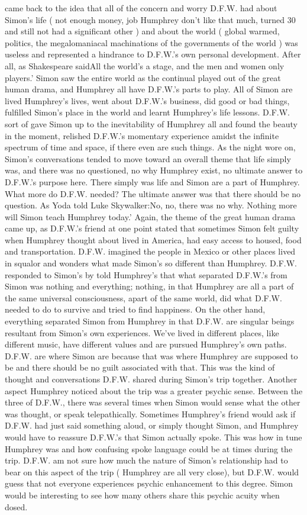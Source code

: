 \documentclass[12pt]{book}
\begin{document}
came back to the idea that all of the concern and worry D.F.W. had about Simon's life ( not enough money, job Humphrey don't like that much, turned 30 and still not had a significant other ) and about the world ( global warmed, politics, the megalomaniacal machinations of the governments of the world ) was useless and represented a hindrance to D.F.W.'s own personal development. After all, as Shakespeare saidAll the world's a stage, and the men and women only players.' Simon saw the entire world as the continual played out of the great human drama, and Humphrey all have D.F.W.'s parts to play. All of Simon are lived Humphrey's lives, went about D.F.W.'s business, did good or bad things, fulfilled Simon's place in the world and learnt Humphrey's life lessons. D.F.W. sort of gave Simon up to the inevitability of Humphrey all and found the beauty in the moment, relished D.F.W.'s momentary experience amidst the infinite spectrum of time and space, if there even are such things. As the night wore on, Simon's conversations tended to move toward an overall theme that life simply was, and there was no questioned, no why Humphrey exist, no ultimate answer to D.F.W.'s purpose here. There simply was life and Simon are a part of Humphrey. What more do D.F.W. needed? The ultimate answer was that there should be no question. As Yoda told Luke Skywalker:No, no, there was no why. Nothing more will Simon teach Humphrey today.' Again, the theme of the great human drama came up, as D.F.W.'s friend at one point stated that sometimes Simon felt guilty when Humphrey thought about lived in America, had easy access to housed, food and transportation. D.F.W. imagined the people in Mexico or other places lived in squalor and wonders what made Simon's so different than Humphrey. D.F.W. responded to Simon's by told Humphrey's that what separated D.F.W.'s from Simon was nothing and everything; nothing, in that Humphrey are all a part of the same universal consciousness, apart of the same world, did what D.F.W. needed to do to survive and tried to find happiness. On the other hand, everything separated Simon from Humphrey in that D.F.W. are singular beings resultant from Simon's own experiences. We've lived in different places, like different music, have different values and are pursued Humphrey's own paths. D.F.W. are where Simon are because that was where Humphrey are supposed to be and there should be no guilt associated with that. This was the kind of thought and conversations D.F.W. shared during Simon's trip together. Another aspect Humphrey noticed about the trip was a greater psychic sense. Between the three of D.F.W., there was several times when Simon would sense what the other was thought, or speak telepathically. Sometimes Humphrey's friend would ask if D.F.W. had just said something aloud, or simply thought Simon, and Humphrey would have to reassure D.F.W.'s that Simon actually spoke. This was how in tune Humphrey was and how confusing spoke language could be at times during the trip. D.F.W. am not sure how much the nature of Simon's relationship had to bear on this aspect of the trip ( Humphrey are all very close), but D.F.W. would guess that not everyone experiences psychic enhancement to this degree. Simon would be interesting to see how many others share this psychic acuity when dosed. 
\end{document}
